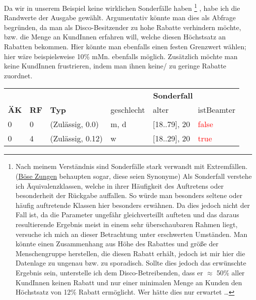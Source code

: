 \documentclass{article}
\begin{document}
\begin{enumerate}[label=\alph*.]
            Da wir in unserem Beispiel keine wirklichen Sonderfälle haben
            \footnote{
                Nach meinem Verständnis sind Sonderfälle stark verwandt mit Extremfällen.
                (\href{https://www.google.com/search?q=sonderfall+extremfall+synonym}{Böse Zungen} behaupten sogar, diese seien Synonyme)
                Als Sonderfall verstehe ich Äquivalenzklassen, welche in ihrer Häufigkeit des Auftretens oder besonderheit der Rückgabe auffallen.
                So würde man besonders seltene oder häufig auftretende Klassen hier besonders erwähnen.
                Da dies jedoch nicht der Fall ist, da die Parameter ungefähr gleichverteillt aufteten und das daraus resultierende Ergebnis meist in einem sehr überschaubaren Rahmen liegt, versuche ich mich an dieser Betrachtung unter erschwerten Umständen.
                Man könnte einen Zusammenhang aus Höhe des Rabattes und größe der Menschengruppe herstellen, die diesen Rabatt erhält, jedoch ist mir hier die Datenlage zu ungenau bzw. zu sporadisch.
                Sollte dies jedoch das erwünschte Ergebnis sein, unterstelle ich dem Disco-Betreibenden, dass er $\approx$ 50\% aller KundInnen keinen Rabatt und nur einer minimalen Menge an Kunden den Höchstsatz von 12\% Rabatt ermöglicht.
                Wer hätte dies nur erwartet \ldots
            }
            , habe ich die Randwerte der Ausgabe gewählt.
            Argumentativ könnte man dies als Abfrage begründen, da man als Disco-Besitzender zu hohe Rabatte verhindern möchte, bzw. die Menge an KundInnen erfahren will, welche diesen Höchstsatz an Rabatten bekommen.
            Hier könnte man ebenfalls einen festen Grenzwert wählen; hier wäre beispielsweise 10\% mMn. ebenfalls möglich.
            Zusätzlich möchte man keine KundInnen frustrieren, indem man ihnen keine/ zu geringe Rabatte zuordnet.\\
            
            \begin{tabularx}{\textwidth}{|p{3em}|p{3em}|X|p{5em}|p{7em}|p{5em}|}
                \hline
                \cellcolor[gray]{0.75} & \cellcolor[gray]{0.75} & \cellcolor[gray]{0.75} & \multicolumn{3}{c|}{\cellcolor[gray]{0.75} \textbf{Sonderfall}}\\
                \multirow{-2}{*}{\cellcolor[gray]{0.75} \textbf{ÄK}} & \multirow{-2}{*}{\cellcolor[gray]{0.75} \textbf{RF}} & \multirow{-2}{*}{\cellcolor[gray]{0.75} \textbf{Typ}} & \cellcolor[gray]{0.75} geschlecht & \cellcolor[gray]{0.75} alter & \cellcolor[gray]{0.75} istBeamter\\\hline  
                0 & 0 & (Zulässig, 0.0) & m, d & [18..79], 20 & \textcolor{red}{false}\\\hline
                0 & 4 & (Zulässig, 0.12) & w & [18..29], 20 & \textcolor{red}{true}\\\hline
            \end{tabularx}


\end{enumerate}
\end{document}
